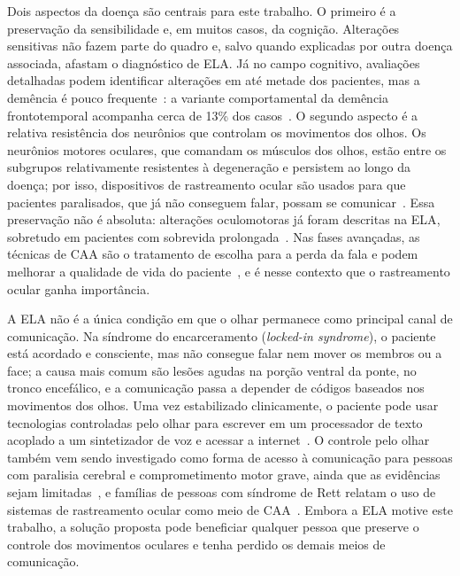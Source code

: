 Dois aspectos da doença são centrais para este trabalho. O primeiro é a preservação da sensibilidade e, em muitos casos, da cognição. Alterações sensitivas não fazem parte do quadro e, salvo quando explicadas por outra doença associada, afastam o diagnóstico de \gls{ELA}. Já no campo cognitivo, avaliações detalhadas podem identificar alterações em até metade dos pacientes, mas a demência é pouco frequente~\cite{pcdt_ela2020}: a variante comportamental da demência frontotemporal acompanha cerca de 13\% dos casos~\cite{hardiman2017als}. O segundo aspecto é a relativa resistência dos neurônios que controlam os movimentos dos olhos. Os neurônios motores oculares, que comandam os músculos dos olhos, estão entre os subgrupos relativamente resistentes à degeneração e persistem ao longo da doença; por isso, dispositivos de rastreamento ocular são usados para que pacientes paralisados, que já não conseguem falar, possam se comunicar~\cite{nijssen2017motor}. Essa preservação não é absoluta: alterações oculomotoras já foram descritas na \gls{ELA}, sobretudo em pacientes com sobrevida prolongada~\cite{sharma2011oculomotor}. Nas fases avançadas, as técnicas de \gls{CAA} são o tratamento de escolha para a perda da fala e podem melhorar a qualidade de vida do paciente~\cite{hardiman2017als}, e é nesse contexto que o rastreamento ocular ganha importância.

A \gls{ELA} não é a única condição em que o olhar permanece como principal canal de comunicação. Na síndrome do encarceramento (\textit{locked-in syndrome}), o paciente está acordado e consciente, mas não consegue falar nem mover os membros ou a face; a causa mais comum são lesões agudas na porção ventral da ponte, no tronco encefálico, e a comunicação passa a depender de códigos baseados nos movimentos dos olhos. Uma vez estabilizado clinicamente, o paciente pode usar tecnologias controladas pelo olhar para escrever em um processador de texto acoplado a um sintetizador de voz e acessar a internet~\cite{laureys2005locked}. O controle pelo olhar também vem sendo investigado como forma de acesso à comunicação para pessoas com paralisia cerebral e comprometimento motor grave, ainda que as evidências sejam limitadas~\cite{karlsson2018eyegaze}, e famílias de pessoas com síndrome de Rett relatam o uso de sistemas de rastreamento ocular como meio de \gls{CAA}~\cite{townend2016rett}. Embora a \gls{ELA} motive este trabalho, a solução proposta pode beneficiar qualquer pessoa que preserve o controle dos movimentos oculares e tenha perdido os demais meios de comunicação.

